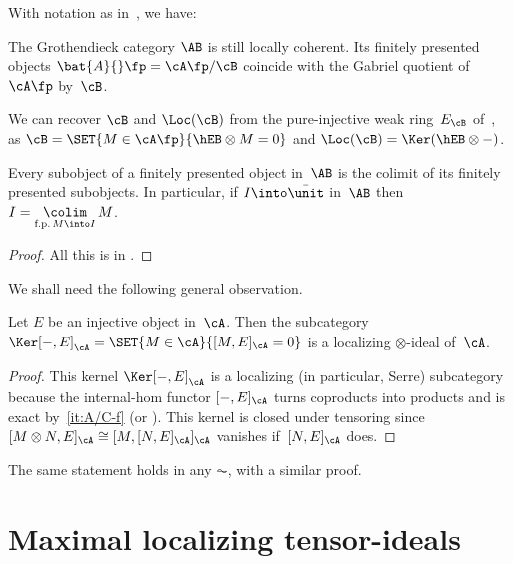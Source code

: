 \begin{Prop}
\label{Prop:A/B}
With notation as in~, we have:
\begin{enumeratea}
\item
\label{it:A/B-a}
The Grothendieck category $\AB$ is still locally coherent. Its finitely presented objects $\bat{A}{}\fp=\cA\fp/\cB$ coincide with the Gabriel quotient of~$\cA\fp$ by~$\cB$.

\item
\label{it:A/B-b}
We can recover $\cB$ and $\Loc(\cB)$ from the pure-injective weak ring~$E_\cB$ of~, as $\cB=\SET{M\in\cA\fp}{\hEB\otimes M=0}$ and $\Loc(\cB)=\Ker(\hEB\otimes-)$.

\item
\label{it:A/B-c}
Every subobject of a finitely presented object in~$\AB$ is the colimit of its finitely presented subobjects. In particular, if $I\into \bar\unit$ in~$\AB$ then $I=\mathop{\colim}\limits_{\textrm{f.p.\,}M\into I}M$.
\end{enumeratea}
\end{Prop}

\begin{proof}
All this is in \cite[\S3]{BalmerKrauseStevenson19}.
\end{proof}

We shall need the following general observation.

\begin{Lem}
\label{Lem:Ker[-,E]}
Let $E$ be an injective object in~$\cA$. Then the subcategory $\Ker [-,E]_{\cA}=\SET{M\in\cA}{[M,E]_{\cA}=0}$ is a localizing $\otimes$-ideal of~$\cA$.
\end{Lem}

\begin{proof}
This kernel $\Ker[-,E]_{\cA}$ is a localizing (in particular, Serre) subcategory because the internal-hom functor $[-,E]_{\cA}$ turns coproducts into products and is exact by \,\eqref{it:A/C-f} (or \cite[Lem.\,2.8]{BalmerKrauseStevenson19}). This kernel is closed under tensoring since $[M\otimes N,E]_{\cA}\cong [M,[N,E]_{\cA}]_{\cA}$ vanishes if~$[N,E]_{\cA}$ does.
\end{proof}

\begin{Rem}
The same statement holds in any $\AC$, with a similar proof.
\end{Rem}

\section{Maximal localizing tensor-ideals}
\label{sec:maximal}

